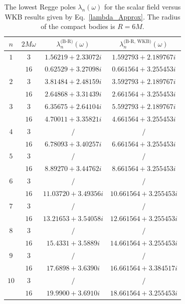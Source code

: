 \documentclass[aps,prd,longbibliography,reprint,twocolumn,amsmath,amssymb,amsfonts,showpacs,footnote,superscriptaddress]{revtex4-1}%
\begin{document}
\begingroup
\squeezetable
\begin{table}[htp]
\caption{\label{tab:table5} The lowest Regge poles $\lambda_{n}(\omega)$ for the scalar field versus WKB results given by Eq.~\eqref{lambda_Approx}. The radius of the compact bodies is $R = 6M$.}
\smallskip
\centering
\begin{ruledtabular}
\begin{tabular}{cccc}
 $n$ & $2 M \omega$  & $\lambda^{\text{(B-R)}}_n(\omega)$ & $\lambda^{\text{(B-R, WKB)}}_n(\omega)$
 \\ \hline
$1$  & $3$  & $1.56219+2.33072 i$  & $1.592793+2.189767i$   \\
     & $16$ & $ 0.62529+3.27098 i$ & $0.661564+3.255453i $   \\

$2$  & $3$  & $3.81484+2.48159 i$  & $3.592793+2.189767i $    \\
     & $16$ & $2.64868+3.31439 i$  & $2.661564+3.255453i $    \\

$3$  & $3$  & $6.35675+2.64104 i$ & $5.592793+2.189767i $    \\
     & $16$ & $4.70011+3.35821 i$  & $4.661564+3.255453i $    \\

$4$  & $3$  & $/$  & $ / $   \\
     & $16$ & $6.78093+3.40257 i$  & $6.661564+3.255453i $  \\

$5$  & $3$  & $/$  & $/$     \\
     & $16$ & $8.89270+3.44762 i$  & $8.661564+3.255453i $   \\

$6$  & $3$  & $/$  & $/$    \\
     & $16$ & $11.03720+3.49356 i$ & $10.661564+3.255453i $ \\

$7$  & $3$  & $/$ & $/$     \\
     & $16$ & $13.21653+3.54058 i$  & $12.661564+3.255453i$ \\

$8$  & $3$ & $/$   & $/$     \\
     & $16$ & $15.4331+3.5889 i$  & $14.661564+3.255453i $  \\

$9$  & $3$ & $/$   & $/$   \\
     & $16$ & $17.6898+3.6390 i$  & $16.661564+3.384517i $   \\

$10$  & $3$  & $/$  & $/$   \\
     & $16$  & $19.9900+3.6910 i$  & $18.661564+3.255453i $  \\
\end{tabular}
\end{ruledtabular}
\end{table}
\endgroup
\end{document}
